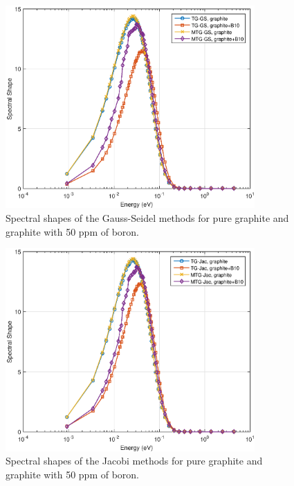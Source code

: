 \documentclass[preprint,10pt]{elsarticle}
\begin{document}
\begin{figure}
\centering
\includegraphics[width=0.85\textwidth]{figures/SS_GS_graphite.eps}
\caption{Spectral shapes of the Gauss-Seidel methods for pure graphite and graphite with 50 ppm of boron.}
\label{fig::Flat_FA_TGandMTG}
\end{figure}

\begin{figure}
\centering
\includegraphics[width=0.85\textwidth]{figures/SS_Jac_graphite.eps}
\caption{Spectral shapes of the Jacobi methods for pure graphite and graphite with 50 ppm of boron.}
\label{fig::Flat_FA_TGandMTG}
\end{figure}
\end{document}
